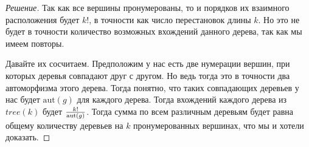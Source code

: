 \documentclass[12pt,a4paper]{extarticle}
\newcommand{\aut}{\mathrm{aut}}
\begin{document}
\begin{proof}[Решение]
		Так как все вершины пронумерованы, то и порядков их взаимного расположения будет $k!$, в точности как число перестановок длины $k$. Но это не будет в точности количество возможных вхождений данного дерева, так как мы имеем повторы.
		
		Давайте их сосчитаем. Предположим у нас есть две нумерации вершин, при которых деревья совпадают друг с другом. Но ведь тогда это в точности два автоморфизма этого дерева. Тогда понятно, что таких совпадающих деревьев у нас будет $\aut(g)$ для каждого дерева. Тогда вхождений каждого дерева из $tree(k)$ будет ${k! \over \aut(g)}$. Тогда сумма по всем различным деревьям будет равна общему количеству деревьев на $k$ пронумерованных вершинах, что мы и хотели доказать.
		
	\end{proof}












	\newpage
	
	
	
	
	
	
	
\end{document}
